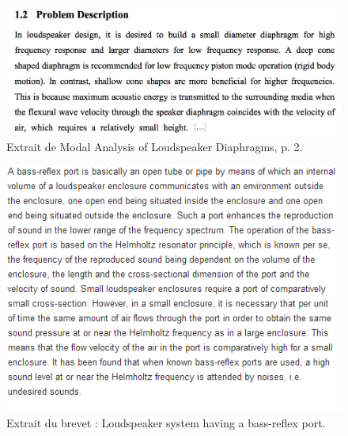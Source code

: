 \begin{figure}[h]
\begin{center}
\includegraphics[scale=0.35]{img/Trace2-Miller.png}
\end{center}
\caption{Extrait de \og Modal Analysis of Loudspeaker Diaphragms\fg, p. 2. \cite{Miller}} %
\label{Trace 2}
\end{figure}

\begin{figure}[h]
\begin{center}
\includegraphics{img/Trace-3-US6275597.png}
\end{center}
\caption{Extrait du brevet : \og Loudspeaker system having a bass-reflex port.\fg \cite{US6275597}} %
 \label{Trace 3}
\end{figure}

